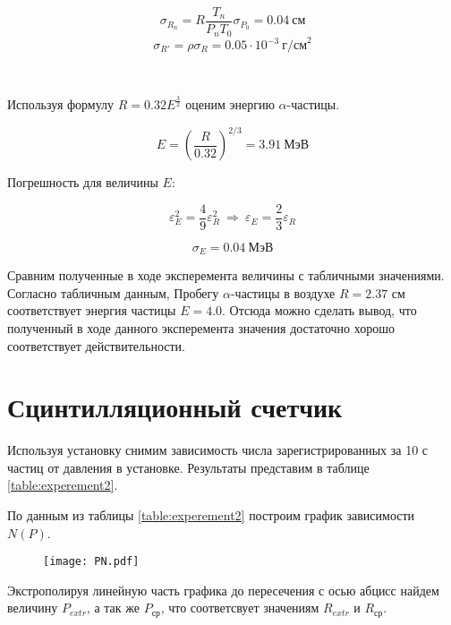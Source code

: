     \[ \sigma_{R_n} = R \frac{T_n}{P_n T_0} \sigma_{P_0} = 0.04 ~ \text{см} \]
    \[ \sigma_{R'} = \rho \sigma_R = 0.05 \cdot 10^{-3}  ~ \text{г/см}^2 \]

    \begin{center}
        \\
    \end{center}

    Используя формулу $R = 0.32 E^{\frac{3}{2}}$ оценим энергию $\alpha$-частицы.

    \[ E = \left(\frac{R}{0.32} \right)^{2/3} = 3.91 ~ \text{МэВ} \]

    Погрешность для величины $E$:

    \[ \varepsilon_E^2 = \frac{4}{9} \varepsilon_R^2 ~ \Rightarrow ~ \varepsilon_E = \frac{2}{3} \varepsilon_R \]

    \[ \sigma_E = 0.04 ~ \text{МэВ} \]

    \begin{center}
    \end{center}

    Сравним полученные в ходе эксперемента величины с табличными значениями. Согласно табличным данным,
    Пробегу $\alpha$-частицы в воздухе $R = 2.37$ см соответствует энергия частицы $E = 4.0$. Отсюда
    можно сделать вывод, что полученный в ходе данного эксперемента значения достаточно хорошо соответствует 
    действительности.

    \section*{Сцинтилляционный счетчик}

    Используя установку снимим зависимость числа зарегистрированных за 10 с частиц от давления в установке.
    Результаты представим в таблице \ref{table:experement2}.

    

    По данным из таблицы \ref{table:experement2} построим график зависимости $N(P)$.

    \begin{figure}
        \centering
        \texttt{[image: PN.pdf]}
        \caption{}
        \label{fig:plot2}
    \end{figure}

    Экстрополируя линейную часть графика до пересечения с осью абцисс найдем величину $P_{extr}$, а так же
    $P_{\text{ср}}$, что соответсвует значениям $R_{extr}$ и $R_{\text{ср}}$.

